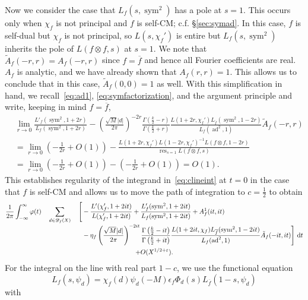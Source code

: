 \documentclass[11pt,reqno]{amsart} \usepackage{fullpage}
\newcommand{\vep}{\varepsilon}
\newcommand{\ra}{\rightarrow}
\renewcommand{\d}[1]{\,\operatorname*{d}\!{#1}}
\newcommand\be{\begin{equation}}
\newcommand\ee{\end{equation}}
\newcommand{\Lsym}[2][]{L_f#1\left(#2,\sym^2\right)}
\newcommand{\Lchi}[2][]{L(#2,\chi_f#1)}
\DeclareMathOperator{\res}{res}
\DeclareMathOperator{\sym}{sym}
\DeclareMathOperator{\ad}{ad}
\newcommand{\D}{\mathcal D_f}
\newcommand{\gf}{\Phi_d}
\newcommand{\gfactor}[2][]{\gf#1\left(#2\right)}
\numberwithin{equation}{section}
\begin{document}
Now we consider the case that $\Lsym{s}$ has a pole at $s=1$. This occurs only when
$\chi_f$ is not principal and $f$ is self-CM; c.f. \S\ref{sec:symad}.
In this case, $f$ is self-dual but $\chi_f$ is not principal, so $\Lchi[']{s}$ is
entire but $\Lsym{s}$ inherits the pole of $L(f\otimes f,s)$ at $s=1$. We note that
$\tilde A_f(-r,r)=A_f(-r,r)$ since $f=\overline f$ and hence all Fourier
coefficients are real. $A_f$ is analytic, and we have already shown that
$A_f(r,r)=1$. This allows us to conclude that in this case, $\tilde A_f(0,0)=1$ as
well. With this simplification in hand, we recall~\eqref{eq:ad1},
\eqref{eq:symfactorization}, and the argument principle and write, keeping in mind
$f=\overline f$,
\be\begin{aligned}
  &\lim_{r\ra0}\frac{L'_f(\sym^2,1+2r)}{L_f(\sym^2,1+2r)}
  -\left(\frac{\sqrt M |d|}{2\pi}\right)^{-2r}
      \frac{\Gamma\left(\frac k2-r\right)}{\Gamma\left(\frac k2+r\right)}
      \frac{\Lchi[']{1+2r}L_{\overline f}(\sym^2,1-2r)}
  {L_f(\ad^2,1)}\tilde{A}_f(-r,r) \\
  &=\lim_{r\ra0}\left(-\frac1{2r}+O(1)\right)
  -\frac{\Lchi[']{1+2r}\Lchi[']{1-2r}^{-1}L(f\otimes f,1-2r)}{\res_{s=1}L(f\otimes f,s)} \\
  &=\lim_{r\ra0}\left(-\frac1{2r}+O(1)\right)-\left(-\frac1{2r}+O(1)\right)=O(1).
\end{aligned}\ee
This establishes regularity of the integrand in~\eqref{eq:clineint} at $t=0$ in the
case that $f$ is self-CM and allows us to move the path of integration to
$c=\tfrac12$ to obtain
\begin{multline} \frac1{2\pi}\int_{-\infty}^\infty \varphi(t)\;\;\;\;\;\;\;
\sum_{\mathclap{\substack{d\in\D(X)\\\ }}}\;\;\;\;\;\;\;
\begin{aligned}[t]\Bigg[
&-\frac{L'(\chi'_f,1+2it)}{L(\chi'_f,1+2it)}
+\frac{L'_f(\sym^2,1+2it)}{L_f(\sym^2,1+2it)}+A_f^1(it,it) \\
&-\eta_f\left(\frac{\sqrt M |d|}{2\pi}\right)^{-2it}
\frac{\Gamma\left(\frac k2-it\right)}{\Gamma\left(\frac k2+it\right)}
\frac{\Lchi{1+2it}L_{\overline f}(\sym^2,1-2it)}
{L_f(\ad^2,1)}\tilde{A}_f(-it,it)
\Bigg] \d t\end{aligned} \\ +O(X^{1/2+\vep}).\end{multline}
For the integral on the line with real part $1-c$, we use the functional equation
\be\label{eq:sleektwistedfuneq}
L_{f}(s,\psi_d)=\chi_f(d)\psi_d(-M)\epsilon_f\gfactor{s}L_{\overline f}(1-s,\psi_d)\ee with
\end{document}
